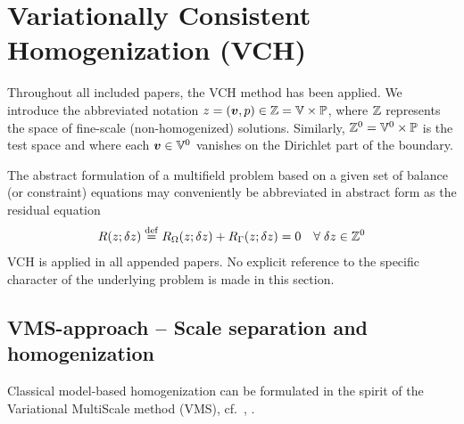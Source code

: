 \documentclass[MikaelDissertation.tex]{subfiles}
\begin{document}
\section{Variationally Consistent Homogenization (VCH)}

Throughout all included papers, the VCH method has been applied.
We introduce the abbreviated notation $z = (\boldsymbol{v}, p) \in \mathbb{Z} = \mathbb{V} \times \mathbb{P}$, where $\mathbb{Z}$ represents the space of fine-scale (non-homogenized) solutions.
Similarly, $\mathbb{Z}^0 = \mathbb{V}^0 \times \mathbb{P}$ is the test space and where each $\boldsymbol{v}\in \mathbb{V}^0$ vanishes on the Dirichlet part of the boundary.

The abstract formulation of a multifield problem based on a given set of balance (or constraint) equations may conveniently be abbreviated in abstract form as the residual equation
\begin{align}
 R(z; \delta z) \overset{\mathrm{def}}{=} R_\Omega(z; \delta z) + R_\Gamma(z;\delta z) = 0\quad \forall\;\delta z\in \mathbb{Z}^0
\label{eq:A1}
\end{align}
VCH is applied in all appended papers.
No explicit reference to the specific character of the underlying problem is made in this section.

\subsection{VMS-approach -- Scale separation and homogenization}

Classical model-based homogenization can be formulated in the spirit of the Variational MultiScale method (VMS), cf.\ \cite{hughes_variational_1998}, \cite{larson_adaptive_2007}.
\end{document}
